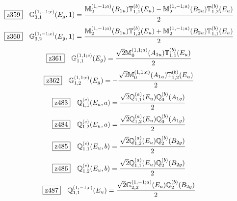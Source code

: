 \documentclass[fleqn,10pt,landscape]{jsarticle}
\begin{document}
\begin{dmath*}
\hspace*{3mm}\fbox{z359}\quad \mathbb{G}_{3,1}^{(1,-1;c)}(E_{g},1)=\frac{\mathbb{M}_{2}^{(1,-1;a)}(B_{1u}) \mathbb{T}_{1,1}^{(b)}(E_{u}) - \mathbb{M}_{2}^{(1,-1;a)}(B_{2u}) \mathbb{T}_{1,2}^{(b)}(E_{u})}{2}
\end{dmath*}
\begin{dmath*}
\hspace*{3mm}\fbox{z360}\quad \mathbb{G}_{3,2}^{(1,-1;c)}(E_{g},1)=\frac{\mathbb{M}_{2}^{(1,-1;a)}(B_{1u}) \mathbb{T}_{1,2}^{(b)}(E_{u}) + \mathbb{M}_{2}^{(1,-1;a)}(B_{2u}) \mathbb{T}_{1,1}^{(b)}(E_{u})}{2}
\end{dmath*}
\begin{dmath*}
\hspace*{3mm}\fbox{z361}\quad \mathbb{G}_{1,1}^{(1,1;c)}(E_{g})=\frac{\sqrt{2} \mathbb{M}_{0}^{(1,1;a)}(A_{1u}) \mathbb{T}_{1,1}^{(b)}(E_{u})}{2}
\end{dmath*}
\begin{dmath*}
\hspace*{3mm}\fbox{z362}\quad \mathbb{G}_{1,2}^{(1,1;c)}(E_{g})=- \frac{\sqrt{2} \mathbb{M}_{0}^{(1,1;a)}(A_{1u}) \mathbb{T}_{1,2}^{(b)}(E_{u})}{2}
\end{dmath*}
\begin{dmath*}
\hspace*{3mm}\fbox{z483}\quad \mathbb{Q}_{1,1}^{(c)}(E_{u},a)=\frac{\sqrt{2} \mathbb{Q}_{1,1}^{(a)}(E_{u}) \mathbb{Q}_{0}^{(b)}(A_{1g})}{2}
\end{dmath*}
\begin{dmath*}
\hspace*{3mm}\fbox{z484}\quad \mathbb{Q}_{1,2}^{(c)}(E_{u},a)=\frac{\sqrt{2} \mathbb{Q}_{1,2}^{(a)}(E_{u}) \mathbb{Q}_{0}^{(b)}(A_{1g})}{2}
\end{dmath*}
\begin{dmath*}
\hspace*{3mm}\fbox{z485}\quad \mathbb{Q}_{1,1}^{(c)}(E_{u},b)=\frac{\sqrt{2} \mathbb{Q}_{1,2}^{(a)}(E_{u}) \mathbb{Q}_{2}^{(b)}(B_{2g})}{2}
\end{dmath*}
\begin{dmath*}
\hspace*{3mm}\fbox{z486}\quad \mathbb{Q}_{1,2}^{(c)}(E_{u},b)=\frac{\sqrt{2} \mathbb{Q}_{1,1}^{(a)}(E_{u}) \mathbb{Q}_{2}^{(b)}(B_{2g})}{2}
\end{dmath*}
\begin{dmath*}
\hspace*{3mm}\fbox{z487}\quad \mathbb{Q}_{1,1}^{(1,-1;c)}(E_{u})=\frac{\sqrt{2} \mathbb{G}_{2,2}^{(1,-1;a)}(E_{u}) \mathbb{Q}_{2}^{(b)}(B_{2g})}{2}
\end{dmath*}
\end{document}
